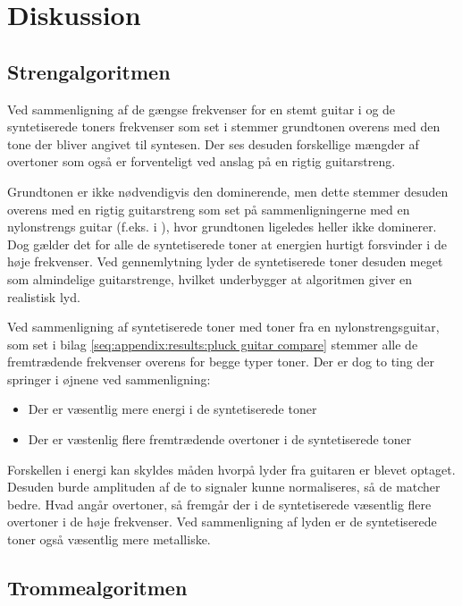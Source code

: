 \section{Diskussion}

\subsection{Strengalgoritmen}

Ved sammenligning af de gængse frekvenser for en stemt guitar i  og de syntetiserede toners frekvenser som set i  stemmer grundtonen overens med den tone der bliver angivet til syntesen.
Der ses desuden forskellige mængder af overtoner som også er forventeligt ved anslag på en rigtig guitarstreng.

Grundtonen er ikke nødvendigvis den dominerende, men dette stemmer desuden overens med en rigtig guitarstreng som set på sammenligningerne med en nylonstrengs guitar (f.eks. i ), hvor grundtonen ligeledes heller ikke dominerer.
Dog gælder det for alle de syntetiserede toner at energien hurtigt forsvinder i de høje frekvenser.
Ved gennemlytning lyder de syntetiserede toner desuden meget som almindelige guitarstrenge, hvilket underbygger at algoritmen giver en realistisk lyd.

Ved sammenligning af syntetiserede toner med toner fra en nylonstrengsguitar, som set i bilag \ref{seq:appendix:results:pluck guitar compare} stemmer alle de fremtrædende frekvenser overens for begge typer toner.
Der er dog to ting der springer i øjnene ved sammenligning:

\begin{itemize}
  \item Der er væsentlig mere energi i de syntetiserede toner
  \item Der er væstenlig flere fremtrædende overtoner i de syntetiserede toner
\end{itemize}

Forskellen i energi kan skyldes måden hvorpå lyder fra guitaren er blevet optaget. Desuden burde amplituden af de to signaler kunne normaliseres, så de matcher bedre.
Hvad angår overtoner, så fremgår der i de syntetiserede væsentlig flere overtoner i de høje frekvenser.
Ved sammenligning af lyden er de syntetiserede toner også væsentlig mere metalliske.

\subsection{Trommealgoritmen}

